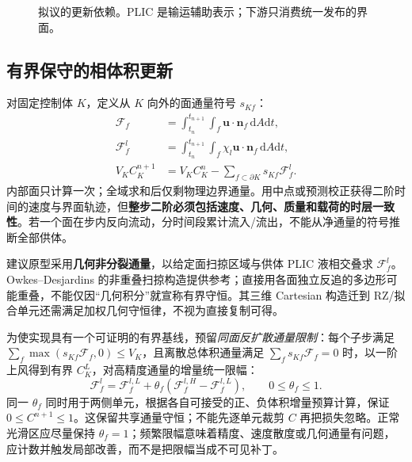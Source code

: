 \documentclass[11pt,a4paper]{article}
\newcommand{\dd}{\mathrm{d}}
\newcommand{\vct}[1]{\boldsymbol{#1}}
\begin{document}
\begin{figure}[ht]
\centering
{}
\caption{拟议的更新依赖。PLIC 是输运辅助表示；下游只消费统一发布的界面。}
\end{figure}

\subsection{有界保守的相体积更新}
对固定控制体 $K$，定义从 $K$ 向外的面通量符号 $s_{Kf}$：
\begin{align}
 \mathcal F_f &=\int_{t_n}^{t_{n+1}}\int_f\vct u\cdot\vct n_f\,\dd A\dd t,\\
 \mathcal F_f^l &=\int_{t_n}^{t_{n+1}}\int_f\chi_l\vct u\cdot\vct n_f\,\dd A\dd t,\\
 V_KC_K^{n+1}&=V_KC_K^n-\sum_{f\subset\partial K}s_{Kf}\mathcal F_f^l.\label{eq:fv}
\end{align}
内部面只计算一次；全域求和后仅剩物理边界通量。用中点或预测校正获得二阶时间的速度与界面轨迹，但\textbf{整步二阶必须包括速度、几何、质量和载荷的时层一致性}。若一个面在步内反向流动，分时间段累计流入/流出，不能从净通量的符号推断全部供体。

建议原型采用\textbf{几何非分裂通量}，以给定面扫掠区域与供体 PLIC 液相交叠求 $\mathcal F_f^l$。Owkes--Desjardins 的非重叠扫掠构造提供参考\cite{owkes2014}；直接用各面独立反追的多边形可能重叠，不能仅因“几何积分”就宣称有界守恒。其三维 Cartesian 构造迁到 RZ/拟合单元还需满足加权几何守恒律，不视为直接复制可得。

为使实现具有一个可证明的有界基线，预留\emph{同面反扩散通量限制}：每个子步满足 $\sum_f\max(s_{Kf}\mathcal F_f,0)\le V_K$，且离散总体积通量满足 $\sum_fs_{Kf}\mathcal F_f=0$ 时，以一阶上风得到有界 $C_K^L$，对高精度通量的增量统一限幅：
\begin{equation}
 \mathcal F_f^l=\mathcal F_f^{l,L}
    +\theta_f(\mathcal F_f^{l,H}-\mathcal F_f^{l,L}),\qquad0\le\theta_f\le1.\label{eq:limiter}
\end{equation}
同一 $\theta_f$ 同时用于两侧单元，根据各自可接受的正、负体积增量预算计算，保证 $0\le C^{n+1}\le1$。这保留共享通量守恒；不能先逐单元裁剪 $C$ 再把损失忽略。正常光滑区应尽量保持 $\theta_f=1$；频繁限幅意味着精度、速度散度或几何通量有问题，应计数并触发局部改善，而不是把限幅当成不可见补丁。
\end{document}
